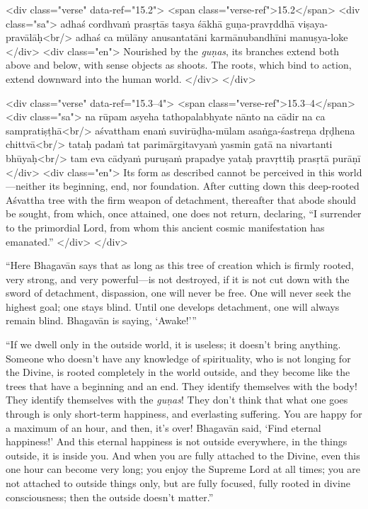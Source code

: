 \begin{html}
<div class="verse" data-ref="15.2">
  <span class="verse-ref">15.2</span>
  <div class="sa">
    adhaś cordhvaṁ prasṛtās tasya śākhā guṇa-pravṛddhā viṣaya-pravālāḥ<br/>
    adhaś ca mūlāny anusantatāni karmānubandhīni manuṣya-loke
  </div>
  <div class="en">
    Nourished by the \textit{guṇas}, its branches extend both above and below, with sense objects as shoots. The roots, which bind to action, extend downward into the human world.
  </div>
</div>
\end{html}



\begin{html}
<div class="verse" data-ref="15.3–4">
  <span class="verse-ref">15.3–4</span>
  <div class="sa">
    na rūpam asyeha tathopalabhyate nānto na cādir na ca sampratiṣṭhā<br/>
    aśvattham enaṁ suvirūḍha-mūlam asaṅga-śastreṇa dṛḍhena chittvā<br/>
    tataḥ padaṁ tat parimārgitavyaṁ yasmin gatā na nivartanti bhūyaḥ<br/>
    tam eva cādyaṁ puruṣaṁ prapadye yataḥ pravṛttiḥ prasṛtā purāṇī
  </div>
  <div class="en">
    Its form as described cannot be perceived in this world---neither its beginning, end, nor foundation. After cutting down this deep-rooted Aśvattha tree with the firm weapon of detachment, thereafter that abode should be sought, from which, once attained, one does not return, declaring, \enquote{I surrender to the primordial Lord, from whom this ancient cosmic manifestation has emanated.}
  </div>
</div>
\end{html}


\enquote{Here Bhagavān says that as long as this tree of creation which is firmly rooted, very strong, and very powerful---is not destroyed, if it is not cut down with the sword of detachment, dispassion, one will never be free. One will never seek the highest goal; one stays blind. Until one develops detachment, one will always remain blind. Bhagavān is saying, \enquote{Awake!}}

\enquote{If we dwell only in the outside world, it is useless; it doesn’t bring anything. Someone who doesn’t have any knowledge of spirituality, who is not longing for the Divine, is rooted completely in the world outside, and they become like the trees that have a beginning and an end. They identify themselves with the body! They identify themselves with the \textit{guṇas}! They don’t think that what one goes through is only short-term happiness, and everlasting suffering. You are happy for a maximum of an hour, and then, it’s over! Bhagavān said, \enquote{Find eternal happiness!} And this eternal happiness is not outside everywhere, in the things outside, it is inside you. And when you are fully attached to the Divine, even this one hour can become very long; you enjoy the Supreme Lord at all times; you are not attached to outside things only, but are fully focused, fully rooted in divine consciousness; then the outside doesn’t matter.}

